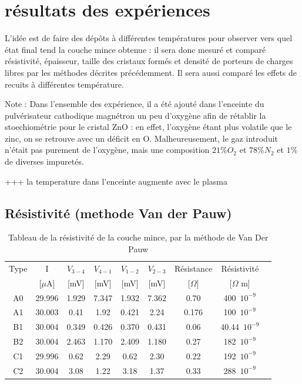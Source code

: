 \documentclass[a4paper,12pt,oneside]{article}
\begin{document}
\section{résultats des expériences}

L'idée est de faire des dépôts à différentes températures pour observer vers quel état final tend la couche mince obtenue : il sera donc mesuré et comparé résistivité, épaisseur, taille des cristaux formés et densité de porteurs de charges libres par les méthodes décrites précédemment. Il sera aussi comparé les effets de recuits à différentes température.

Note : Dans l'ensemble des expérience, il a été ajouté dans l'enceinte du pulvérisateur cathodique magnétron un peu d'oxygène afin de rétablir la stoechiométrie pour le cristal ZnO : en effet, l'oxygène étant plus volatile que le zinc, on se retrouve avec un déficit en O. Malheureusement, le gaz introduit n'était pas purement de l'oxygène, mais une composition $21 \% O_2 $ et $78 \% N_2 $ et $1 \% $ de diverses impuretés.

+++ la temperature dans l'enceinte augmente avec le plasma

\subsection{Résistivité (methode Van der Pauw)}

\begin{table}
\centering
   \begin{tabular}{|c|c|c|c|c|c|c|c|c|}
	  \hline
      Type & I & $V_{3-4}$ & $V_{4-1}$ & $V_{1-2}$ & $V_{2-3}$ & Résistance& Résistivité\\
      &  [$\mu$A] & [mV] & [mV] & [mV] & [mV] & [$\Omega$] & [$\Omega$ m] \\
      \hline
      A0 & 29.996 & 1.929 & 7.347 & 1.932 & 7.362 & 0.70 & 400\ $10^{-9}$\\
      A1 & 30.003 & 0.41 & 1.92 & 0.421 & 2.24 & 0.176 & 100\ $10^{-9}$\\
      B1 & 30.004 & 0.349 & 0.426 & 0.370 & 0.431 & 0.06 & 40.44\ $10^{-9}$\\
      B2 & 30.004 & 2.463 & 1.170 & 2.409 & 1.180 & 0.27 & 182\ $10^{-9}$\\
      C1 & 29.996 & 0.62 & 2.29 & 0.62 & 2.30 & 0.22 & 192\ $10^{-9}$\\
      C2 & 30.004 & 3.08 & 1.22 & 3.18 & 1.37 & 0.33 & 288\ $10^{-9}$\\
      \hline
   \end{tabular}
   \caption{Tableau de la résistivité de la couche mince, par la méthode de Van Der Pauw}\label{tab:vanderpauw}
\end{table}
\end{document}
